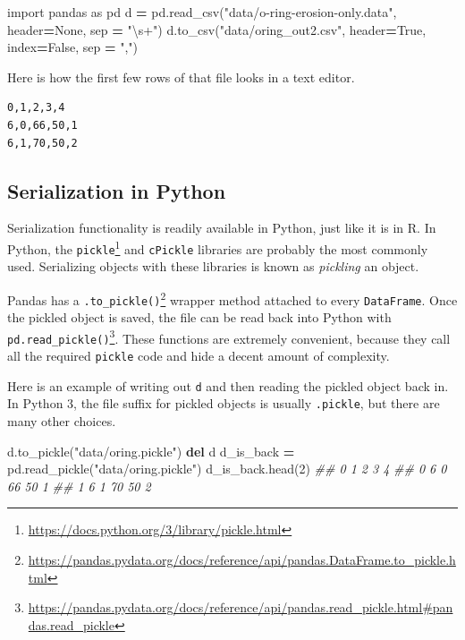 \documentclass[
  12pt,
  krantz2]{krantz}
\makeatletter
\newenvironment{Shaded}{\begin{snugshade}}{\end{snugshade}}
\newcommand{\CommentTok}[1]{\textcolor[rgb]{0.37,0.37,0.37}{\textit{#1}}}
\newcommand{\DecValTok}[1]{\textcolor[rgb]{0.06,0.06,0.06}{#1}}
\newcommand{\ImportTok}[1]{#1}
\newcommand{\KeywordTok}[1]{\textcolor[rgb]{0.27,0.27,0.27}{\textbf{#1}}}
\newcommand{\NormalTok}[1]{#1}
\newcommand{\OperatorTok}[1]{\textcolor[rgb]{0.43,0.43,0.43}{\textbf{#1}}}
\newcommand{\StringTok}[1]{\textcolor[rgb]{0.5,0.5,0.5}{#1}}
\newcommand{\VariableTok}[1]{\textcolor[rgb]{0,0,0}{#1}}
\renewcommand{\href}[2]{#2\footnote{\url{#1}}}
\newenvironment{kframe}{%
\medskip{}
\setlength{\fboxsep}{.8em}
 \def\at@end@of@kframe{}%
 \ifinner\ifhmode%
  \def\at@end@of@kframe{\end{minipage}}%
  \begin{minipage}{\columnwidth}%
 \fi\fi%
 \def\FrameCommand##1{\hskip\@totalleftmargin \hskip-\fboxsep
 \colorbox{shadecolor}{##1}\hskip-\fboxsep
     \hskip-\linewidth \hskip-\@totalleftmargin \hskip\columnwidth}%
 \MakeFramed {\advance\hsize-\width
   \@totalleftmargin\z@ \linewidth\hsize
   \@setminipage}}%
 {\par\unskip\endMakeFramed%
 \at@end@of@kframe}
\renewenvironment{Shaded}{\begin{kframe}}{\end{kframe}}
\makeatother
\begin{document}
\begin{Shaded}
\begin{Highlighting}[]
\ImportTok{import}\NormalTok{ pandas }\ImportTok{as}\NormalTok{ pd}
\NormalTok{d }\OperatorTok{=}\NormalTok{ pd.read\_csv(}\StringTok{"data/o{-}ring{-}erosion{-}only.data"}\NormalTok{, header}\OperatorTok{=}\VariableTok{None}\NormalTok{, sep }\OperatorTok{=} \StringTok{"\textbackslash{}s+"}\NormalTok{)}
\NormalTok{d.to\_csv(}\StringTok{"data/oring\_out2.csv"}\NormalTok{, header}\OperatorTok{=}\VariableTok{True}\NormalTok{, index}\OperatorTok{=}\VariableTok{False}\NormalTok{, sep }\OperatorTok{=} \StringTok{","}\NormalTok{)}
\end{Highlighting}
\end{Shaded}

Here is how the first few rows of that file looks in a text editor.

\begin{verbatim}
0,1,2,3,4
6,0,66,50,1
6,1,70,50,2
\end{verbatim}

\hypertarget{serialization-in-python}{%
\subsection{Serialization in Python}\label{serialization-in-python}}

Serialization functionality is readily available in Python, just like it is in R. In Python, the \href{https://docs.python.org/3/library/pickle.html}{\texttt{pickle}} and \texttt{cPickle} libraries are probably the most commonly used. Serializing objects with these libraries is known as \emph{pickling} an object.

Pandas has a \href{https://pandas.pydata.org/docs/reference/api/pandas.DataFrame.to_pickle.html}{\texttt{.to\_pickle()}} wrapper method attached to every \texttt{DataFrame}. Once the pickled object is saved, the file can be read back into Python with \href{https://pandas.pydata.org/docs/reference/api/pandas.read_pickle.html\#pandas.read_pickle}{\texttt{pd.read\_pickle()}}. These functions are extremely convenient, because they call all the required \texttt{pickle} code and hide a decent amount of complexity.

Here is an example of writing out \texttt{d} and then reading the pickled object back in. In Python 3, the file suffix for pickled objects is usually \texttt{.pickle}, but there are many other choices.

\begin{Shaded}
\begin{Highlighting}[]
\NormalTok{d.to\_pickle(}\StringTok{"data/oring.pickle"}\NormalTok{)}
\KeywordTok{del}\NormalTok{ d}
\NormalTok{d\_is\_back }\OperatorTok{=}\NormalTok{ pd.read\_pickle(}\StringTok{"data/oring.pickle"}\NormalTok{)}
\NormalTok{d\_is\_back.head(}\DecValTok{2}\NormalTok{)}
\CommentTok{\#\#    0  1   2   3  4}
\CommentTok{\#\# 0  6  0  66  50  1}
\CommentTok{\#\# 1  6  1  70  50  2}
\end{Highlighting}
\end{Shaded}
\end{document}
